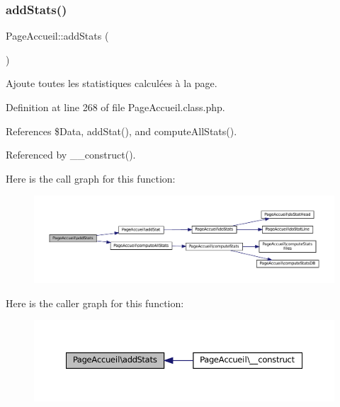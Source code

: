 \subsubsection{\texorpdfstring{add\+Stats()}{addStats()}}
{\footnotesize\ttfamily Page\+Accueil\+::add\+Stats (\begin{DoxyParamCaption}{ }\end{DoxyParamCaption})}

Ajoute toutes les statistiques calculées à la page. 

Definition at line 268 of file Page\+Accueil.\+class.\+php.



References \$\+Data, add\+Stat(), and compute\+All\+Stats().



Referenced by \+\_\+\+\_\+construct().

Here is the call graph for this function\+:\nopagebreak
\begin{figure}[H]
\begin{center}
\leavevmode
\includegraphics[width=350pt]{class_page_accueil_a92f6557a9cfaf1e0f49d7461d7fac2c4_cgraph}
\end{center}
\end{figure}
Here is the caller graph for this function\+:\nopagebreak
\begin{figure}[H]
\begin{center}
\leavevmode
\includegraphics[width=350pt]{class_page_accueil_a92f6557a9cfaf1e0f49d7461d7fac2c4_icgraph}
\end{center}
\end{figure}
\mbox{\label{class_page_accueil_a4acc4c64a5b79fd4d0f12ccbeeabe83e}} 
